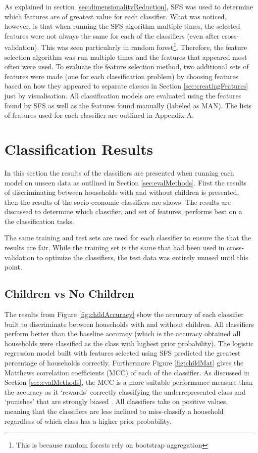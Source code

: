 As explained in section \ref{sec:dimensionalityReduction}, SFS was used to determine which features are of greatest value for each classifier. What was noticed, however, is that when running the SFS algorithm multiple times, the selected features were not always the same for each of the classifiers (even after cross-validation). This was seen particularly in random forest\footnote{This is because random forests rely on bootstrap aggregation}.  Therefore, the feature selection algorithm was run multiple times and the features that appeared most often were used. To evaluate the feature selection method, two additional sets of features were made (one for each classification problem) by choosing features based on how they appeared to separate classes in Section \ref{sec:creatingFeatures} just by visualisation. All classification models are evaluated using the features found by SFS as well as the features found manually (labeled as MAN). The lists of features used for each classifier are outlined in Appendix A. 

\section{Classification Results}

In this section the results of the classifiers are presented when running each model on unseen data as outlined in Section \ref{sec:evalMethods}. First the results of discriminating between households with and without children is presented, then the results of the socio-economic classifiers are shows. The results are discussed to determine which classifier, and set of features, performs best on a the classification tasks.

The same training and test sets are used for each classifier to ensure the that the results are fair. While the training set is the same that had been used in cross-validation to optimize the classifiers, the test data was entirely unused until this point.

\subsection{Children vs No Children}

\childConf
\childAccuracy

The results from Figure \ref{fig:childAccuracy} show the accuracy of each classifier built to discriminate between households with and without children. All classifiers perform better than the baseline accuracy (which is the accuracy obtained all households were classified as the class with highest prior probability). The logistic regression model built with features selected using SFS predicted the greatest percentage of households correctly. Furthermore Figure \ref{fig:childMat} gives the Matthews correlation coefficients (MCC) of each of the classifier. As discussed in Section \ref{sec:evalMethods}, the MCC is a more suitable performance measure than the accuracy as it `rewards' correctly classifying the underrepresented class and `punishes' that are strongly biased \cite{Beckel_3}. All classifiers take on positive values, meaning that the classifiers are less inclined to miss-classify a household regardless of which class has a higher prior probability. 

